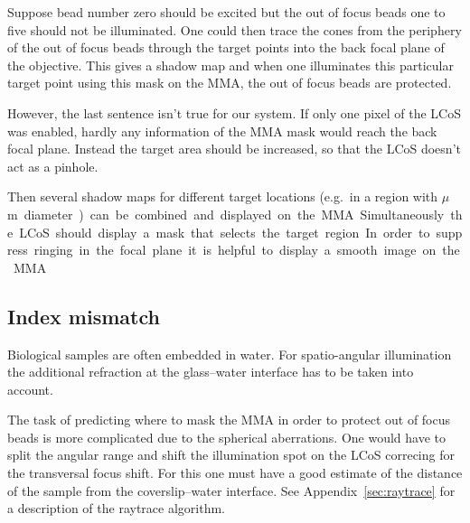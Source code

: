Suppose bead number zero should be excited but the out of focus beads
one to five should not be illuminated. One could then trace the cones
from the periphery of the out of focus beads through the target points
into the back focal plane of the objective. This gives a shadow map
and when one illuminates this particular target point using this mask
on the MMA, the out of focus beads are protected.

However, the last sentence isn't true for our system. If only one
pixel of the LCoS was enabled, hardly any information of the MMA mask
would reach the back focal plane. Instead the target area should be
increased, so that the LCoS doesn't act as a pinhole.

Then several shadow maps for different target locations (e.g.\ in a
region with \unit[3]{$\mu$m} diameter) can be combined and displayed
on the MMA.  Simultaneously the LCoS should display a mask that
selects the target region. In order to suppress ringing in the focal
plane it is helpful to display a smooth image on the MMA.









\subsection{Index mismatch}

Biological samples are often embedded in water. For spatio-angular
illumination the additional refraction at the glass--water interface
has to be taken into account.

The task of predicting where to mask the MMA in order to protect out
of focus beads is more complicated due to the spherical
aberrations. One would have to split the angular range and shift the
illumination spot on the LCoS correcing for the transversal focus
shift. For this one must have a good estimate of the distance of the
sample from the coverslip--water interface. See
Appendix~\ref{sec:raytrace} for a description of the raytrace
algorithm.

